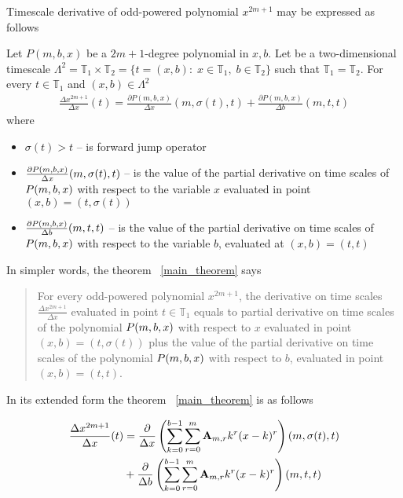 Timescale derivative of odd-powered polynomial $x^{2m+1}$ may be expressed as follows
\begin{thm}
    \label{main_theorem}
    Let $P(m,b,x)$ be a $2m+1$-degree polynomial in $x,b$.
    Let be a two-dimensional timescale
    $\Lambda^2 = \mathbb{T}_1 \times \mathbb{T}_2 = \{t=(x, b) \colon \; x\in\mathbb{T}_1, \; b\in\mathbb{T}_2 \}$
    such that $\mathbb{T}_1 = \mathbb{T}_2$.
    For every $t\in\mathbb{T}_1$ and $(x,b) \in \Lambda^2$
    \begin{align*}
        \frac{\Delta x^{2m+1}}{\Delta x}(t) =
        \frac{\partial P(m,b,x)}{\Delta x} (m, \sigma(t), t) +
        \frac{\partial P(m,b,x)}{\Delta b} (m, t, t)
    \end{align*}
    where
    \begin{itemize}
        \setlength\itemsep{1em}
        \item  $\sigma(t) > t$ -- is forward jump operator

        \item $\frac{\partial P ( m, b, x )}{\Delta x} (m, \sigma(t), t)$ --
        is the value of the partial derivative on time scales of
        $P ( m, b, x )$ with respect to the variable $x$ evaluated in point $(x, b)=  (t, \sigma(t))$

        \item $\frac{\partial P ( m, b, x )}{\Delta b} (m, t, t)$ --
        is the value of the partial derivative on time scales of
        $P ( m, b, x )$ with respect to the variable $b$, evaluated at $(x,b) = (t, t)$
    \end{itemize}
\end{thm}
In simpler words, the theorem ~\ref{main_theorem} says
\begin{center}
    \begin{quotation}
        For every odd-powered polynomial $x^{2m+1}$, the derivative on time scales $\frac{\Delta x^{2m+1}}{\Delta x}$
        evaluated in point $t\in\mathbb{T}_1$ equals to partial derivative on time scales of the polynomial
        $P ( m, b, x )$
        with respect to $x$
        evaluated in point
        $(x,b) = (t, \sigma(t))$
        plus the value of the partial derivative on time scales of the polynomial
        $P ( m, b, x )$
        with respect to $b$,
        evaluated in point
        $(x,b)=(t,t)$.
    \end{quotation}
\end{center}

In its extended form the theorem ~\ref{main_theorem} is as follows

\begin{align*}
    \frac{\Delta x^{2m+1}}{\Delta x}(t)
    &= \frac{\partial}{\Delta x} \left( \sum_{k=0}^{b-1} \sum_{r=0}^{m} {\mathbf{A}} \sb{m,r} k^r(x-k)^r \right) (m, \sigma(t), t) \\
    &+ \frac{\partial}{\Delta b} \left( \sum_{k=0}^{b-1} \sum_{r=0}^{m} {\mathbf{A}} \sb{m,r} k^r(x-k)^r \right) (m, t, t)
\end{align*}
